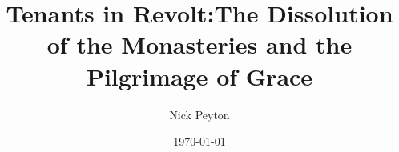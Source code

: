 \documentclass[12pt]{article}
\begin{document}
\begin{titlepage}
\title{Tenants in Revolt:\linebreak The Dissolution of the Monasteries and the Pilgrimage of Grace}
\author{Nick Peyton}
\date{\today}
\maketitle

\setcounter{page}{0}
\thispagestyle{empty}
\end{titlepage}
\pagebreak \newpage
\end{document}
